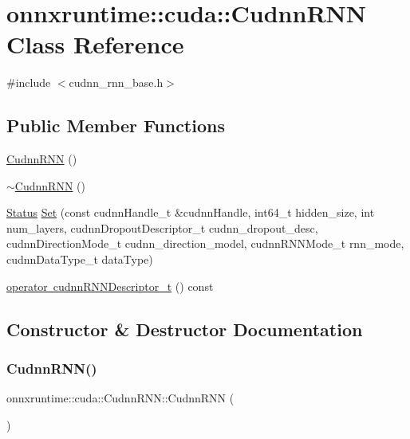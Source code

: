 \hypertarget{classonnxruntime_1_1cuda_1_1CudnnRNN}{}\section{onnxruntime\+:\+:cuda\+:\+:Cudnn\+R\+NN Class Reference}
\label{classonnxruntime_1_1cuda_1_1CudnnRNN}


{\ttfamily \#include $<$cudnn\+\_\+rnn\+\_\+base.\+h$>$}

\subsection*{Public Member Functions}
\begin{DoxyCompactItemize}
\item 
\mbox{\hyperlink{classonnxruntime_1_1cuda_1_1CudnnRNN_aad296166d24f6aae89be08d2ead6da1b}{Cudnn\+R\+NN}} ()
\item 
\mbox{\hyperlink{classonnxruntime_1_1cuda_1_1CudnnRNN_ad011ce11489d06ca2750fb8cf084e8bc}{$\sim$\+Cudnn\+R\+NN}} ()
\item 
\mbox{\hyperlink{classonnxruntime_1_1common_1_1Status}{Status}} \mbox{\hyperlink{classonnxruntime_1_1cuda_1_1CudnnRNN_a95bce3f205252c4d31eea609d49d3869}{Set}} (const cudnn\+Handle\+\_\+t \&cudnn\+Handle, int64\+\_\+t hidden\+\_\+size, int num\+\_\+layers, cudnn\+Dropout\+Descriptor\+\_\+t cudnn\+\_\+dropout\+\_\+desc, cudnn\+Direction\+Mode\+\_\+t cudnn\+\_\+direction\+\_\+model, cudnn\+R\+N\+N\+Mode\+\_\+t rnn\+\_\+mode, cudnn\+Data\+Type\+\_\+t data\+Type)
\item 
\mbox{\hyperlink{classonnxruntime_1_1cuda_1_1CudnnRNN_ab402c6e7de57dc43b89feda8eb2c2258}{operator cudnn\+R\+N\+N\+Descriptor\+\_\+t}} () const
\end{DoxyCompactItemize}


\subsection{Constructor \& Destructor Documentation}
\mbox{\label{classonnxruntime_1_1cuda_1_1CudnnRNN_aad296166d24f6aae89be08d2ead6da1b}} 
\subsubsection{\texorpdfstring{Cudnn\+R\+N\+N()}{CudnnRNN()}}
{\footnotesize\ttfamily onnxruntime\+::cuda\+::\+Cudnn\+R\+N\+N\+::\+Cudnn\+R\+NN (\begin{DoxyParamCaption}{ }\end{DoxyParamCaption})\hspace{0.3cm}{\ttfamily [inline]}}

